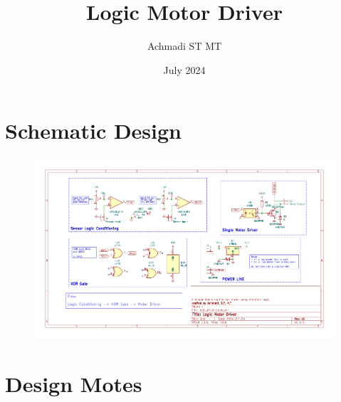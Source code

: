 \documentclass[a4paper,12pt,oneside,pdflatex,italian,final]{article}
\title{Logic Motor Driver}
\author{Achmadi ST MT}
\date{July 2024}
\begin{document}
	\pagestyle{fancy}

	\chead{\today}

	\section{Schematic Design}

    \begin{figure}[h]
        \includegraphics[width=\textwidth]{images/logic_driver.png}
    \end{figure}
    
    \section{Design Motes}
    
\end{document}
